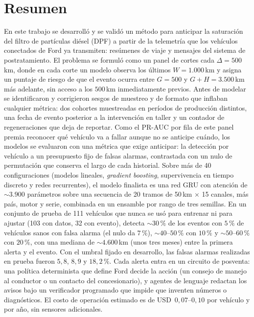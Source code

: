 \section*{Resumen}

En este trabajo se desarrolló y se validó un método para anticipar la saturación del filtro de partículas diésel (DPF) a
partir de la telemetría que los vehículos conectados de Ford ya transmiten: resúmenes de viaje y mensajes del sistema de
postratamiento. El problema se formuló como un panel de cortes cada $\Delta = 500$\,km, donde en cada corte un modelo
observa los últimos $W = 1.000$\,km y asigna un puntaje de riesgo de que el evento ocurra entre $G = 500$ y
$G + H = 3.500$\,km más adelante, sin acceso a los $500$\,km inmediatamente previos. Antes de modelar se identificaron y corrigieron sesgos de
muestreo y de formato que inflaban cualquier métrica: dos cohortes muestreadas en períodos de producción distintos, una fecha
de evento posterior a la intervención en taller y un contador de regeneraciones que deja de reportar. Como el PR-AUC por
fila de este panel premia reconocer qué vehículo va a fallar aunque no se anticipe cuándo, los modelos se evaluaron con
una métrica que exige anticipar: la detección por vehículo a un presupuesto fijo de falsas alarmas, contrastada con un
nulo de permutación que conserva el largo de cada historial. Sobre más de 40 configuraciones (modelos
lineales, \emph{gradient boosting}, supervivencia en tiempo discreto y redes recurrentes), el modelo finalista es una red
GRU con atención de $\sim 3.900$ parámetros sobre una secuencia de 20 tramos de 50\,km $\times$ 15 canales, más país, motor
y serie, combinada en un ensamble por rango de tres semillas. En un conjunto de prueba de 111 vehículos que nunca se usó para
entrenar ni para ajustar (103 con datos, 32 con evento), detecta $\sim 30\,\%$ de los eventos con $5\,\%$ de vehículos sanos con
falsa alarma (el nulo da $7\,\%$), $\sim 40$--$50\,\%$ con $10\,\%$ y $\sim 50$--$60\,\%$ con $20\,\%$, con una mediana de
$\sim 4.600$\,km (unos tres meses) entre la primera alerta y el evento. Con el umbral fijado en desarrollo, las falsas
alarmas realizadas en prueba fueron $5{,}8$, $8{,}9$ y $18{,}2\,\%$. Cada alerta entra en un circuito de posventa: una
política determinista que define Ford decide la acción (un consejo de manejo al conductor o un contacto del
concesionario), y agentes de lenguaje redactan los avisos bajo un verificador programado que impide que inventen números o
diagnósticos. El costo de operación estimado es de USD~$0{,}07$--$0{,}10$ por vehículo y por año, sin sensores
adicionales.

\clearpage
\tableofcontents
\clearpage
